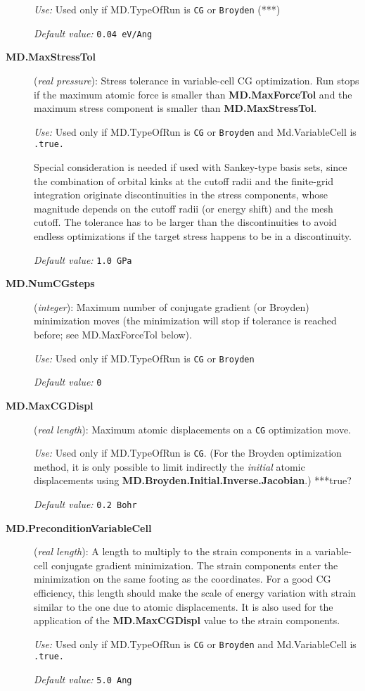 \documentclass[11pt]{article}
\begin{document}
\begin{description}
{\it Use:} Used only if MD.TypeOfRun is {\tt CG} or {\tt Broyden} (***)
    
{\it Default value:} {\tt 0.04 eV/Ang}


\item[{\bf MD.MaxStressTol}] ({\it real pressure}):
Stress tolerance in variable-cell CG optimization. Run stops
if the maximum atomic force is smaller than {\bf MD.MaxForceTol}
and the maximum stress component is smaller than {\bf MD.MaxStressTol}.

{\it Use:} Used only if MD.TypeOfRun is {\tt CG} or {\tt Broyden} and
Md.VariableCell is {\tt .true.}

Special consideration is needed if used with Sankey-type basis sets, since 
the combination of orbital kinks at the cutoff radii and the finite-grid
integration originate discontinuities in the
stress components, whose magnitude depends on the cutoff radii (or 
energy shift) and the mesh cutoff. The tolerance has to be larger
than the discontinuities to avoid endless optimizations if the target
stress happens to be in a discontinuity.
   
{\it Default value:} {\tt 1.0 GPa}
 

\item[{\bf MD.NumCGsteps}] ({\it integer}): 
Maximum number of conjugate gradient (or Broyden) minimization
moves (the minimization will stop
if tolerance is reached before; see MD.MaxForceTol below).

{\it Use:} Used only if MD.TypeOfRun is {\tt CG} or {\tt Broyden}
    
{\it Default value:} {\tt 0}

\item[{\bf MD.MaxCGDispl}] ({\it real length}): 
Maximum atomic displacements on a {\tt CG} optimization move.

{\it Use:} Used only if MD.TypeOfRun is {\tt CG}. (For the Broyden
optimization method, it is only possible to limit indirectly the {\it
  initial\/} atomic displacements using {\bf
  MD.Broyden.Initial.Inverse.Jacobian}.)  ***true?
    
{\it Default value:} {\tt 0.2 Bohr}


\item[{\bf MD.PreconditionVariableCell}] ({\it real length}):
A length to multiply to the strain components in a variable-cell conjugate
gradient minimization. The strain components enter the minimization
on the same footing as the coordinates. For a good CG efficiency, 
this length should make
the scale of energy variation with strain similar to the one 
due to atomic displacements. It is also
used for the application of the {\bf MD.MaxCGDispl} value to
the strain components.
 
{\it Use:} Used only if MD.TypeOfRun is {\tt CG} or {\tt Broyden} and
Md.VariableCell is {\tt .true.}
   
{\it Default value:} {\tt 5.0 Ang}


\end{description}
\end{document}
